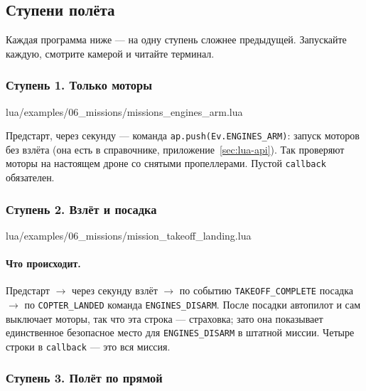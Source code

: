\subsection{Ступени полёта}

Каждая программа ниже --- на одну ступень сложнее предыдущей. Запускайте каждую, смотрите камерой  и читайте терминал.

\subsubsection*{Ступень 1. Только моторы}

\begin{codefile}{lua/examples/06_missions/missions_engines_arm.lua}
\end{codefile}

Предстарт, через секунду --- команда \verb|ap.push(Ev.ENGINES_ARM)|: запуск моторов без взлёта (она есть в справочнике, приложение~\ref{sec:lua-api}). Так проверяют моторы на настоящем дроне со снятыми пропеллерами. Пустой \verb|callback| обязателен.

\subsubsection*{Ступень 2. Взлёт и посадка}

\begin{codefile}{lua/examples/06_missions/mission_takeoff_landing.lua}
\end{codefile}

\paragraph{Что происходит.} Предстарт $\to$ через секунду взлёт $\to$ по событию \verb|TAKEOFF_COMPLETE| посадка $\to$ по \verb|COPTER_LANDED| команда \verb|ENGINES_DISARM|. После посадки автопилот и сам выключает моторы, так что эта строка --- страховка; зато она показывает единственное безопасное место для \verb|ENGINES_DISARM| в штатной миссии. Четыре строки в \verb|callback| --- это вся миссия.

\begin{center}
\end{center}

\subsubsection*{Ступень 3. Полёт по прямой}

